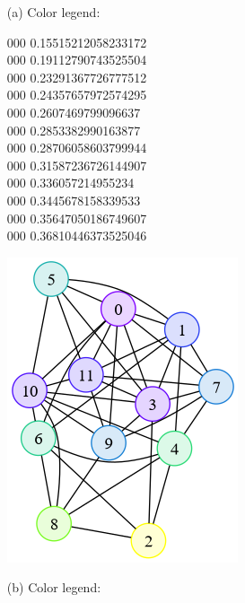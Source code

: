 \documentclass{article}
\begin{document}
\begin{enumerate}
  \item[(a)]
  Color legend:

\colorbox[HTML]{ffff00}{\color[HTML]{ffff00} 000} 0.15515212058233172 \\
\colorbox[HTML]{79fa22}{\color[HTML]{79fa22} 000} 0.19112790743525504 \\
\colorbox[HTML]{2bda76}{\color[HTML]{2bda76} 000} 0.23291367726777512 \\
\colorbox[HTML]{21cc8c}{\color[HTML]{21cc8c} 000} 0.24357657972574295 \\
\colorbox[HTML]{18b0ad}{\color[HTML]{18b0ad} 000} 0.2607469799096637 \\
\colorbox[HTML]{1780d4}{\color[HTML]{1780d4} 000} 0.2853382990163877 \\
\colorbox[HTML]{187dd6}{\color[HTML]{187dd6} 000} 0.28706058603799944 \\
\colorbox[HTML]{2a40f2}{\color[HTML]{2a40f2} 000} 0.31587236726144907 \\
\colorbox[HTML]{421cfb}{\color[HTML]{421cfb} 000} 0.336057214955234 \\
\colorbox[HTML]{5010fd}{\color[HTML]{5010fd} 000} 0.3445678158339533 \\
\colorbox[HTML]{6604fe}{\color[HTML]{6604fe} 000} 0.35647050186749607 \\
\colorbox[HTML]{8000ff}{\color[HTML]{8000ff} 000} 0.36810446373525046

  \includegraphics{ex6a.png}

  \newpage
  \item[(b)]
  Color legend:


\end{enumerate}
\end{document}

